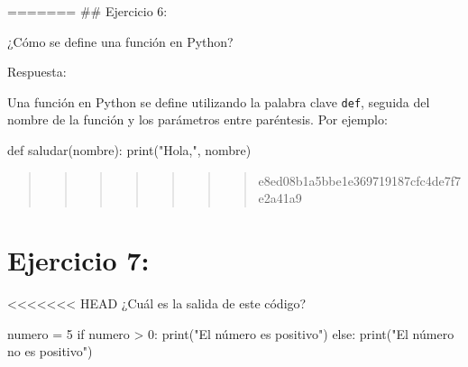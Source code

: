 \documentclass[
  a4paper,
  onepage,
  openany]{scrreprt}
\newenvironment{Shaded}{\begin{snugshade}}{\end{snugshade}}
\newcommand{\BuiltInTok}[1]{\textcolor[rgb]{0.00,0.23,0.31}{#1}}
\newcommand{\ControlFlowTok}[1]{\textcolor[rgb]{0.00,0.23,0.31}{#1}}
\newcommand{\DecValTok}[1]{\textcolor[rgb]{0.68,0.00,0.00}{#1}}
\newcommand{\KeywordTok}[1]{\textcolor[rgb]{0.00,0.23,0.31}{#1}}
\newcommand{\NormalTok}[1]{\textcolor[rgb]{0.00,0.23,0.31}{#1}}
\newcommand{\OperatorTok}[1]{\textcolor[rgb]{0.37,0.37,0.37}{#1}}
\newcommand{\StringTok}[1]{\textcolor[rgb]{0.13,0.47,0.30}{#1}}
\begin{document}
======= \#\# Ejercicio 6:

¿Cómo se define una función en Python?

Respuesta:

Una función en Python se define utilizando la palabra clave
\texttt{def}, seguida del nombre de la función y los parámetros entre
paréntesis. Por ejemplo:

\begin{Shaded}
\begin{Highlighting}[]
\KeywordTok{def}\NormalTok{ saludar(nombre):}
    \BuiltInTok{print}\NormalTok{(}\StringTok{"Hola,"}\NormalTok{, nombre)}
\end{Highlighting}
\end{Shaded}

\begin{quote}
\begin{quote}
\begin{quote}
\begin{quote}
\begin{quote}
\begin{quote}
\begin{quote}
e8ed08b1a5bbe1e369719187cfc4de7f7e2a41a9
\end{quote}
\end{quote}
\end{quote}
\end{quote}
\end{quote}
\end{quote}
\end{quote}

\hypertarget{ejercicio-7}{%
\chapter{Ejercicio 7:}\label{ejercicio-7}}

\textless\textless\textless\textless\textless\textless\textless{} HEAD
¿Cuál es la salida de este código?

\begin{Shaded}
\begin{Highlighting}[]
\NormalTok{numero }\OperatorTok{=} \DecValTok{5}
\ControlFlowTok{if}\NormalTok{ numero }\OperatorTok{\textgreater{}} \DecValTok{0}\NormalTok{:}
    \BuiltInTok{print}\NormalTok{(}\StringTok{"El número es positivo"}\NormalTok{)}
\ControlFlowTok{else}\NormalTok{:}
    \BuiltInTok{print}\NormalTok{(}\StringTok{"El número no es positivo"}\NormalTok{)}
\end{Highlighting}
\end{Shaded}
\end{document}
